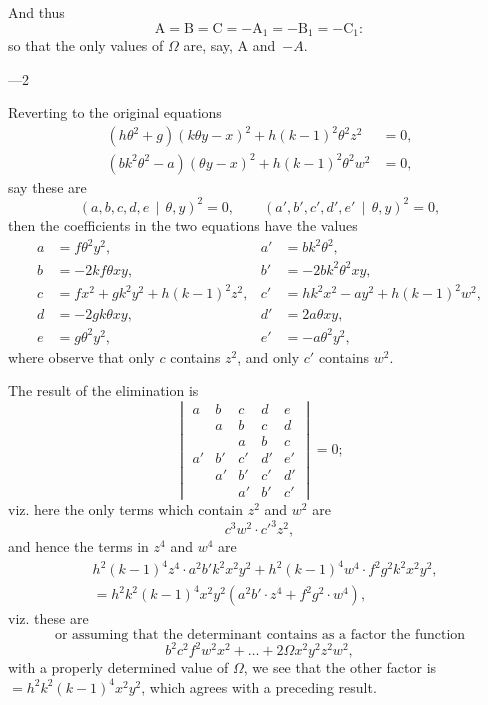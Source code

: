 \documentclass[11pt,a4paper]{book}
\begin{document}
And thus
\[
\text{A} = \text{B} = \text{C} = -\text{A}_{1} = -\text{B}_{1} = -\text{C}_{1}:
\]
so that the only values of $\Omega$ are, say, A and~$-A$.

\medskip{}---2

\newpage
\setcounter{page}{112}

Reverting to the original equations
\begin{align*}
(h\theta^{2} + g)(k\theta y - x)^{2} + h(k-1)^{2}\theta^{2}z^{2} &= 0, \\
(bk^{2}\theta^{2} - a)(\theta y - x)^{2} + h(k-1)^{2}\theta^{2}w^{2} &= 0,
\end{align*}
say these are
\[
(a, b, c, d, e\,\!\!\mid\,\theta, y)^{2} = 0, \qquad (a', b', c', d', e'\,\!\!\mid\,\theta, y)^{2} = 0,
\]
then the coefficients in the two equations have the values
\begin{align*}
a &= f\theta^{2}y^{2}, & a' &= bk^{2}\theta^{2}, \\
b &= -2kf\theta xy, & b' &= -2bk^{2}\theta^{2}xy, \\
c &= fx^{2} + gk^{2}y^{2} + h(k-1)^{2}z^{2}, & c' &= hk^{2}x^{2} - ay^{2} + h(k-1)^{2}w^{2}, \\
d &= -2gk\theta xy, & d' &= 2a\theta xy, \\
e &= g\theta^{2}y^{2}, & e' &= -a\theta^{2}y^{2},
\end{align*}
where observe that only $c$ contains $z^{2}$, and only $c'$ contains $w^{2}$.

The result of the elimination is
\[
\begin{vmatrix}
a & b & c & d & e \\
  & a & b & c & d \\
  &   & a & b & c \\
a' & b' & c' & d' & e' \\
   & a' & b' & c' & d' \\
   &    & a' & b' & c'
\end{vmatrix}
= 0;
\]
viz. here the only terms which contain $z^{2}$ and $w^{2}$ are
\[
c^{3}w^{2} \cdot c'^{3}z^{2},
\]
and hence the terms in $z^{4}$ and $w^{4}$ are
\begin{align*}
&h^{2}(k-1)^{4}z^{4} \cdot a^{2}b'k^{2}x^{2}y^{2} + h^{2}(k-1)^{4}w^{4} \cdot f^{2}g^{2}k^{2}x^{2}y^{2}, \\
&= h^{2}k^{2}(k-1)^{4}x^{2}y^{2}(a^{2}b' \cdot z^{4} + f^{2}g^{2} \cdot w^{4}),
\end{align*}
viz. these are
\[
\text{or assuming that the determinant contains as a factor the function}
\]
\[
b^{2}c^{2}f^{2}w^{2}x^{2} + \ldots + 2\Omega x^{2}y^{2}z^{2}w^{2},
\]
with a properly determined value of $\Omega$, we see that the other factor is $= h^{2}k^{2}(k-1)^{4}x^{2}y^{2}$, which agrees with a preceding result.
\end{document}
